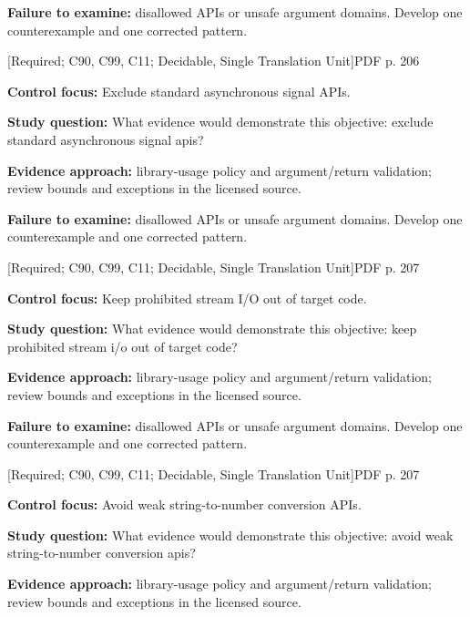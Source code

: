 \documentclass[10pt,letterpaper]{article}
\begin{document}
\textbf{Failure to examine:} disallowed APIs or unsafe argument domains. Develop one counterexample and one corrected pattern.\par
\smallskip
{}
 \textsf{\footnotesize [Required; C90, C99, C11; Decidable, Single Translation Unit]}\hfill{\footnotesize PDF p. 206}\par
\textbf{Control focus:} Exclude standard asynchronous signal APIs.\par
\textbf{Study question:} What evidence would demonstrate this objective: exclude standard asynchronous signal apis?\par
\textbf{Evidence approach:} library-usage policy and argument/return validation; review bounds and exceptions in the licensed source.\par
\textbf{Failure to examine:} disallowed APIs or unsafe argument domains. Develop one counterexample and one corrected pattern.\par
\smallskip
{}
 \textsf{\footnotesize [Required; C90, C99, C11; Decidable, Single Translation Unit]}\hfill{\footnotesize PDF p. 207}\par
\textbf{Control focus:} Keep prohibited stream I/O out of target code.\par
\textbf{Study question:} What evidence would demonstrate this objective: keep prohibited stream i/o out of target code?\par
\textbf{Evidence approach:} library-usage policy and argument/return validation; review bounds and exceptions in the licensed source.\par
\textbf{Failure to examine:} disallowed APIs or unsafe argument domains. Develop one counterexample and one corrected pattern.\par
\smallskip
{}
 \textsf{\footnotesize [Required; C90, C99, C11; Decidable, Single Translation Unit]}\hfill{\footnotesize PDF p. 207}\par
\textbf{Control focus:} Avoid weak string-to-number conversion APIs.\par
\textbf{Study question:} What evidence would demonstrate this objective: avoid weak string-to-number conversion apis?\par
\textbf{Evidence approach:} library-usage policy and argument/return validation; review bounds and exceptions in the licensed source.\par
\end{document}
